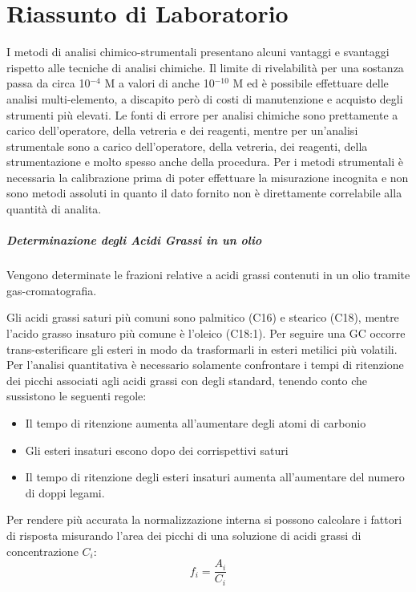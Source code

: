 \chapter{Riassunto di Laboratorio}
I metodi di analisi chimico-strumentali presentano alcuni vantaggi e svantaggi rispetto alle tecniche di analisi chimiche.
Il limite di rivelabilità per una sostanza passa da circa 10$^{-4}$ M a valori di anche 10$^{-10}$ M ed è possibile effettuare delle analisi multi-elemento, a discapito però di costi di manutenzione e acquisto degli strumenti più elevati.
Le fonti di errore per analisi chimiche sono prettamente a carico dell'operatore, della vetreria e dei reagenti, mentre per un'analisi strumentale sono a carico dell'operatore, della vetreria, dei reagenti, della strumentazione e molto spesso anche della procedura.
Per i metodi strumentali è necessaria la calibrazione prima di poter effettuare la misurazione incognita e non sono metodi assoluti in quanto il dato fornito non è direttamente correlabile alla quantità di analita.

\paragraph{Determinazione degli Acidi Grassi in un olio}

Vengono determinate le frazioni relative a acidi grassi contenuti in un olio tramite gas-cromatografia.


Gli acidi grassi saturi più comuni sono palmitico (C16) e stearico (C18), mentre l'acido grasso insaturo più comune è l'oleico (C18:1).
Per seguire una GC occorre trans-esterificare gli esteri in modo da trasformarli in esteri metilici più volatili.
Per l'analisi quantitativa è necessario solamente confrontare i tempi di ritenzione dei picchi associati agli acidi grassi con degli standard, tenendo conto che sussistono le seguenti regole:
\begin{itemize}
\item Il tempo di ritenzione aumenta all'aumentare degli atomi di carbonio
\item Gli esteri insaturi escono dopo dei corrispettivi saturi
\item Il tempo di ritenzione degli esteri insaturi aumenta all'aumentare del numero di doppi legami.
\end{itemize}

Per rendere più accurata la normalizzazione interna si possono calcolare i fattori di risposta misurando l'area dei picchi di una soluzione di acidi grassi di concentrazione $C_i$:
\[
f_i = \frac{A_i}{C_i}
\]

